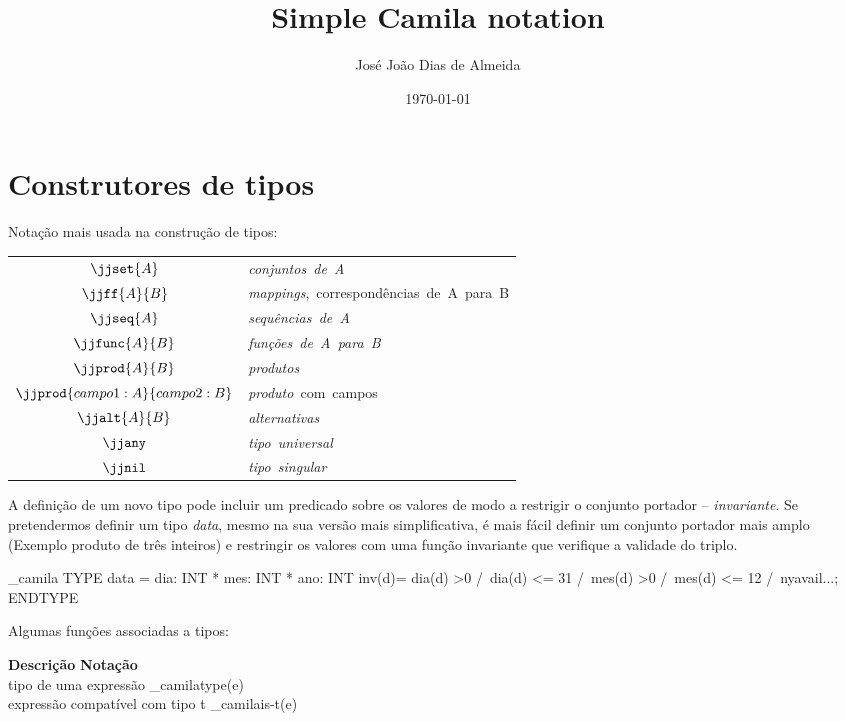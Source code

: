 \documentclass[portuges,a4paper]{article}
\begin{document}
\title{Simple Camila notation}
\author{José João Dias de Almeida}
\date{\today}
\maketitle


\section{Construtores de tipos}

Notação mais usada na construção de tipos:

\begin{center}
\begin{tabular}{|c|l|} \hline
$\jjset{A} $           & \mbox{\emph{conjuntos de A}} \\
$\jjff{A}{B}$          & \mbox{\emph{mappings}, correspondências de A para B} \\
$\jjseq{A}$            & \mbox{\emph{sequências de A}}\\ 
$\jjfunc{A}{B}$        & \mbox{\emph{funções de A para B}}\\ 
$\jjprod{A}{B}$        & \mbox{\emph{produtos}}\\ 
$\jjprod{campo1 : A}{campo2 : B}$ & \mbox{\emph{produto} com campos}\\ 
$\jjalt{A}{B} $        & \mbox{\emph{alternativas}}\\ 
$\jjany$               & \mbox{\emph{tipo universal}}\\
$\jjnil$               & \mbox{\emph{tipo singular}}\\
\hline
\end{tabular}
\end{center}

A definição de um novo tipo pode incluir um predicado sobre os valores
de modo a restrigir o conjunto portador -- \emph{invariante}.
Se pretendermos definir um tipo \emph{data}, mesmo na sua versão mais simplificativa,
é mais fácil definir um conjunto portador mais amplo (Exemplo produto de três 
inteiros) e restringir os valores com uma função invariante que verifique
a validade do triplo.

\_camila{
TYPE 
 data = dia: INT * mes: INT * ano: INT
 inv(d)= dia(d) >0 /\ dia(d) <= 31 /\ mes(d) >0 /\ mes(d) <= 12 /\ nyavail{...};
ENDTYPE
}


Algumas funções associadas a tipos:

\begin{framed}
\noindent \textbf{Descrição}  \hfill  \textbf{Notação} \ \  \\
  tipo de uma expressão \dotfill \_camila{type(e)} \\
  expressão compatível com tipo t \dotfill \_camila{is-t(e)} 
\end{framed}
\end{document}
